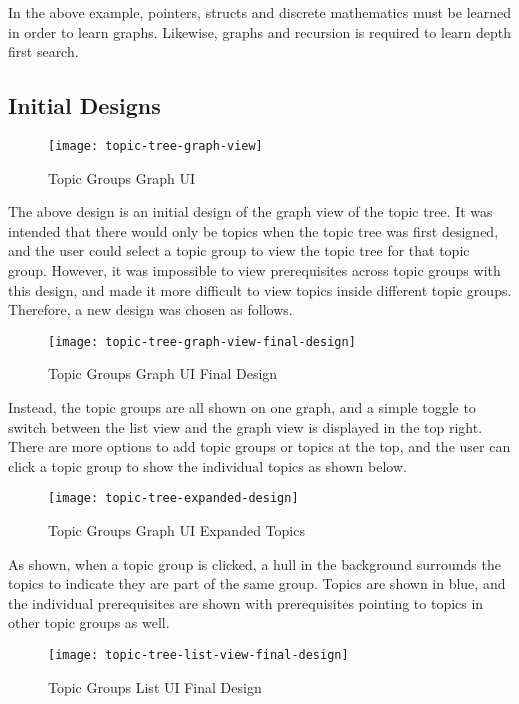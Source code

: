 In the above example, pointers, structs and discrete mathematics must be learned in order to learn graphs. Likewise, graphs and recursion is required to learn depth first search.\\

\subsection{Initial Designs}
\begin{figure}[h!]
    \centering
    \texttt{[image: topic-tree-graph-view]}
    \caption{Topic Groups Graph UI}
\end{figure}

The above design is an initial design of the graph view of the topic tree. It was intended that there would only be topics when the topic tree was first designed, and the user could select a topic group to view the topic tree for that topic group. However, it was impossible to view prerequisites across topic groups with this design, and made it more difficult to view topics inside different topic groups. Therefore, a new design was chosen as follows.

\begin{figure}[h!]
    \centering
    \texttt{[image: topic-tree-graph-view-final-design]}
    \caption{Topic Groups Graph UI Final Design}
\end{figure}

Instead, the topic groups are all shown on one graph, and a simple toggle to switch between the list view and the graph view is displayed in the top right. There are more options to add topic groups or topics at the top, and the user can click a topic group to show the individual topics as shown below.


\begin{figure}[h!]
    \centering
    \texttt{[image: topic-tree-expanded-design]}
    \caption{Topic Groups Graph UI Expanded Topics}
\end{figure}

As shown, when a topic group is clicked, a hull in the background surrounds the topics to indicate they are part of the same group. Topics are shown in blue, and the individual prerequisites are shown with prerequisites pointing to topics in other topic groups as well. 

\begin{figure}[h!]
    \centering
    \texttt{[image: topic-tree-list-view-final-design]}
    \caption{Topic Groups List UI Final Design}
\end{figure}


